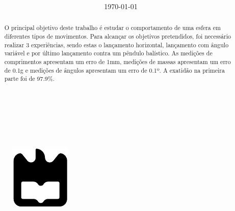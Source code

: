 \documentclass{report}
\begin{document}

%
%
\begin{titlepage}

\begin{center}
%
\vspace*{50mm}
%
{\Huge \titulo}\\
%
\vspace{10mm}
%
{\Large \empresa}\\
%
\vspace{10mm}
%
{\LARGE \autores}\\
%
\vspace{30mm}
%
\begin{figure}[h]
\center
\includegraphics{images/ua}\label{fig:ua-title-logo}
\end{figure}
\end{center}
\end{titlepage}

\title{%
{\Huge\textbf{\titulo}}\\
{\vspace{20mm}}
{\Large \departamento\\ \empresa}
}
%
\author{%
    \autores \\
    \autorescontactos
}
%
\date{\today}
%
\maketitle


\begin{abstract}
    O principal objetivo deste trabalho é estudar o comportamento de uma esfera em diferentes tipos de movimentos. Para alcançar os objetivos pretendidos, foi necessário realizar 3 experiências, sendo estas o lançamento horizontal, lançamento com ângulo variável e por último lançamento contra um pêndulo balístico. As medições de comprimentos apresentam um erro de 1mm, medições de massas apresentam um erro de 0.1g e medições de ângulos apresentam um erro de 0.1º. A exatidão na primeira parte foi de 97.9\%.
\end{abstract}


\tableofcontents
\end{document}
